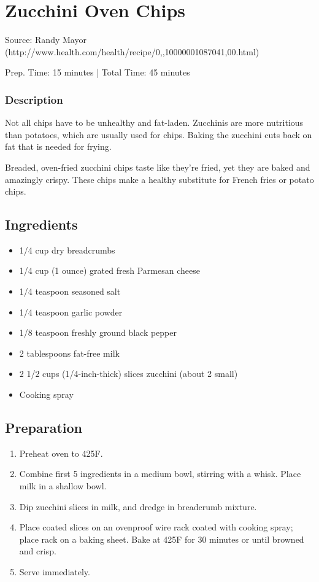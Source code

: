\section{Zucchini Oven Chips}

Source: Randy Mayor (http://www.health.com/health/recipe/0,,10000001087041,00.html)

\begin{center}
Prep. Time: 15 minutes |
Total Time: 45 minutes
\end{center}

\subsubsection{Description}
Not all chips have to be unhealthy and fat-laden. Zucchinis are more nutritious
than potatoes, which are usually used for chips. Baking the zucchini cuts back
on fat that is needed for frying.

Breaded, oven-fried zucchini chips taste like they're fried, yet they are baked
and amazingly crispy. These chips make a healthy substitute for French fries or
potato chips.

\subsection{Ingredients}
\begin{multicols}{2}
\begin{itemize}
    \item 1/4 cup dry breadcrumbs
    \item 1/4 cup (1 ounce) grated fresh Parmesan cheese
    \item 1/4 teaspoon seasoned salt
    \item 1/4 teaspoon garlic powder
    \item 1/8 teaspoon freshly ground black pepper
    \item 2 tablespoons fat-free milk
    \item 2 1/2 cups (1/4-inch-thick) slices zucchini (about 2 small)
    \item Cooking spray
\end{itemize}
\end{multicols}

\subsection{Preparation}
\begin{enumerate}
    \item Preheat oven to 425F.
    \item Combine first 5 ingredients in a medium bowl, stirring with a whisk. Place milk in a shallow bowl.
    \item Dip zucchini slices in milk, and dredge in breadcrumb mixture.
    \item Place coated slices on an ovenproof wire rack coated with cooking spray; place rack on a baking sheet. Bake at 425F for 30 minutes or until browned and crisp.
    \item Serve immediately.
\end{enumerate}

